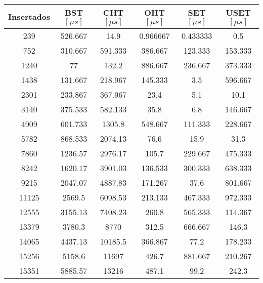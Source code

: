 \begin{table}[H]
\centering
\begin{tabular}{cccccc} \hline
\textbf{Insertados} & \textbf{BST $[\mu s]$} & \textbf{CHT $[\mu s]$} & \textbf{OHT $[\mu s]$} & \textbf{SET $[\mu s]$} & \textbf{USET $[\mu s]$} \\ \hline
239                 & 526.667      & 14.9         & 0.966667     & 0.433333     & 0.5           \\
752                 & 310.667      & 591.333      & 386.667      & 123.333      & 153.333       \\
1240                & 77           & 132.2        & 886.667      & 236.667      & 373.333       \\
1438                & 131.667      & 218.967      & 145.333      & 3.5          & 596.667       \\
2301                & 233.867      & 367.967      & 23.4         & 5.1          & 10.1          \\
3140                & 375.533      & 582.133      & 35.8         & 6.8          & 146.667       \\
4909                & 601.733      & 1305.8       & 548.667      & 111.333      & 228.667       \\
5782                & 868.533      & 2074.13      & 76.6         & 15.9         & 31.3          \\
7860                & 1236.57      & 2976.17      & 105.7        & 229.667      & 475.333       \\
8242                & 1620.17      & 3901.03      & 136.533      & 300.333      & 638.333       \\
9215                & 2047.07      & 4887.83      & 171.267      & 37.6         & 801.667       \\
11125               & 2569.5       & 6098.53      & 213.133      & 467.333      & 972.333       \\
12555               & 3155.13      & 7408.23      & 260.8        & 565.333      & 114.367       \\
13379               & 3780.3       & 8770         & 312.5        & 666.667      & 146.3         \\
14065               & 4437.13      & 10185.5      & 366.867      & 77.2         & 178.233       \\
15256               & 5158.6       & 11697        & 426.7        & 881.667      & 210.267       \\
15351               & 5885.57      & 13216        & 487.1        & 99.2         & 242.3         \\

\end{tabular}
\end{table}

